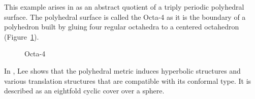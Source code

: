 \documentclass[12pt,reqno]{amsart}
\theoremstyle{definition}
\theoremstyle{remark}
\begin{document}
This example arises in \cite{dami} as an abstract quotient of a triply periodic polyhedral surface. The polyhedral surface is called the Octa-4 as it is the boundary of a polyhedron built by gluing four regular octahedra to a centered octahedron (Figure~\ref{fig:octa4}). 

\begin{figure}[htbp]
    \centering
    \qquad
    \caption{Octa-4}%
    \label{fig:octa4}%
\end{figure}

In \cite{dami}, Lee shows that the polyhedral metric induces hyperbolic structures and various translation structures that are compatible with its conformal type. It is described as an eightfold cyclic cover over a sphere.


\end{document}
